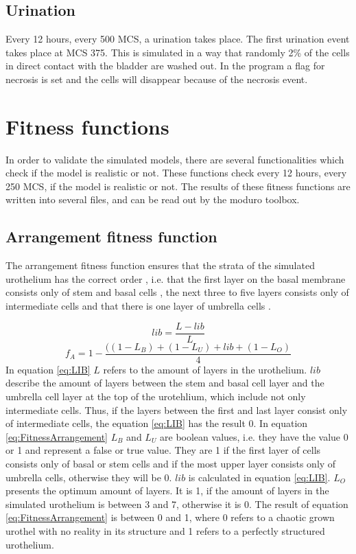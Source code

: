 \subsection{Urination}
Every 12 hours, every 500 \ac{MCS}, a urination takes place. The first urination event takes place at \ac{MCS} 375. This is simulated in a way that randomly 2\% of the cells in direct contact with the bladder are washed out. In the program a flag for necrosis is set and the cells will disappear because of the necrosis event.



\section{Fitness functions}\label{sec:fitnessFunctions}
In order to validate the simulated models, there are several functionalities which check if the model is realistic or not. These functions check every 12 hours, every 250 \ac{MCS}, if the model is realistic or not. The results of these fitness functions are written into several files, and can be read out by the moduro toolbox.

\subsection{Arrangement fitness function} \label{subsec:ArrangementFitness}
The arrangement fitness function ensures that the strata of the simulated urothelium has the correct order \cite{Torelli2017}, i.e. that the first layer on the basal membrane consists only of stem and basal cells \cite{REFS}, the next three to five layers consists only of intermediate cells \cite{REFS} and that there is one layer of umbrella cells \cite{REFS}.

\begin{equation}\label{eq:LIB}
lib = \dfrac{L - lib}{L}
\end{equation}
\begin{equation}\label{eq:FitnessArrangement} 
f_{A} = 1 - \dfrac{((1-L_{B})+(1-L_{U})+lib+(1-L_{O})}{4}
\end{equation}
In equation \ref{eq:LIB} $L$ refers to the amount of layers in the urothelium. $lib$ describe the amount of layers between the stem and basal cell layer and the umbrella cell layer at the top of the urotehlium, which include not only intermediate cells. Thus, if the layers between the first and last layer consist only of intermediate cells, the equation \ref{eq:LIB} has the result 0.\newline
In equation \ref{eq:FitnessArrangement} $L_{B}$ and $L_{U}$ are boolean values, i.e. they have the value 0 or 1 and represent a false or true value. They are 1 if the first layer of cells consists only of basal or stem cells and if the most upper layer consists only of umbrella cells, otherwise they will be 0.
$lib$ is calculated in equation \ref{eq:LIB}. $L_{O}$ presents the optimum amount of layers. It is 1, if the amount of layers in the simulated urothelium is between 3 and 7, otherwise it is 0. The result of equation \ref{eq:FitnessArrangement} is between 0 and 1, where 0 refers to a chaotic grown urothel with no reality in its structure and 1 refers to a perfectly structured urothelium. \newline

